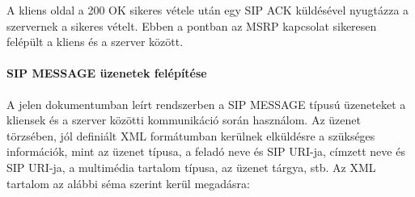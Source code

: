 A kliens oldal a 200 OK sikeres vétele után egy SIP ACK küldésével nyugtázza a szervernek a sikeres vételt. Ebben a pontban az MSRP kapcsolat sikeresen felépült a kliens és a szerver között.

\paragraph{SIP MESSAGE üzenetek felépítése\\}
\label{sec:sip_message}

A jelen dokumentumban leírt rendszerben a SIP MESSAGE típusú üzeneteket a kliensek és a szerver közötti kommunikáció során használom. Az üzenet törzsében, jól definiált XML formátumban kerülnek elküldésre a szükséges információk, mint az üzenet típusa, a feladó neve és SIP URI-ja, címzett neve és SIP URI-ja, a multimédia tartalom típusa, az üzenet tárgya, stb. Az XML tartalom az alábbi séma szerint kerül megadásra:
\fontsize{10}{10}
